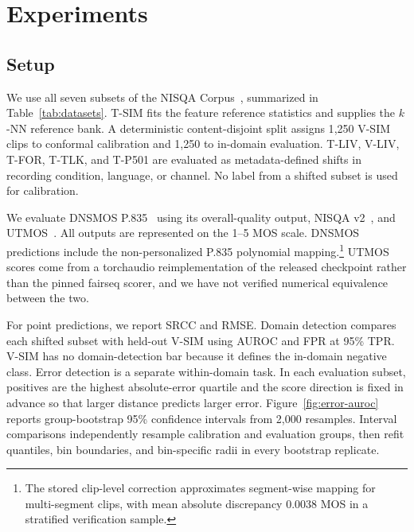 \vspace{-.2cm}
\section{Experiments}
\label{sec:experiments}

\vspace{-.2cm}
\subsection{Setup}
\label{ssec:setup}

We use all seven subsets of the NISQA Corpus~\cite{Mittag2021nisqa}, summarized in Table~\ref{tab:datasets}. T-SIM fits the feature reference statistics and supplies the $k$-NN reference bank. A deterministic content-disjoint split assigns 1{,}250 V-SIM clips to conformal calibration and 1{,}250 to in-domain evaluation. T-LIV, V-LIV, T-FOR, T-TLK, and T-P501 are evaluated as metadata-defined shifts in recording condition, language, or channel. No label from a shifted subset is used for calibration.



We evaluate DNSMOS P.835~\cite{Reddy2022dnsmos} using its overall-quality output, NISQA v2~\cite{Mittag2021nisqa}, and UTMOS~\cite{Saeki2022utmos}. All outputs are represented on the 1--5 MOS scale. DNSMOS predictions include the non-personalized P.835 polynomial mapping.\footnote{The stored clip-level correction approximates segment-wise mapping for multi-segment clips, with mean absolute discrepancy 0.0038 MOS in a stratified verification sample.} UTMOS scores come from a torchaudio reimplementation of the released checkpoint rather than the pinned fairseq scorer, and we have not verified numerical equivalence between the two.

For point predictions, we report SRCC and RMSE. Domain detection compares each shifted subset with held-out V-SIM using AUROC and FPR at 95\% TPR. V-SIM has no domain-detection bar because it defines the in-domain negative class. Error detection is a separate within-domain task. In each evaluation subset, positives are the highest absolute-error quartile and the score direction is fixed in advance so that larger distance predicts larger error. Figure~\ref{fig:error-auroc} reports group-bootstrap 95\% confidence intervals from 2{,}000 resamples. Interval comparisons independently resample calibration and evaluation groups, then refit quantiles, bin boundaries, and bin-specific radii in every bootstrap replicate.

